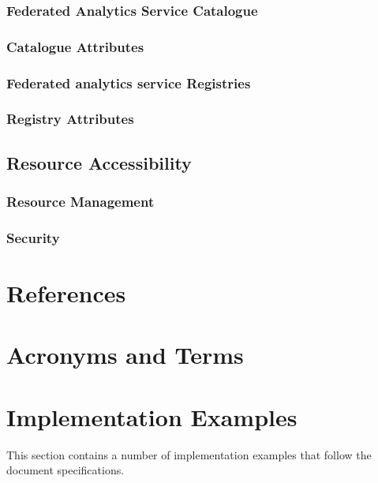 \documentclass[12pt]{article}
\begin{document}
\subsubsection{Federated Analytics Service Catalogue}
\subsubsection{Catalogue Attributes}
\subsubsection{Federated analytics service Registries}
\subsubsection{Registry Attributes}

\subsection{Resource Accessibility}
\subsubsection{Resource Management}
\subsubsection{Security}





\section*{References}



\appendix

\section{Acronyms and Terms}


\begin{quote}
    
\end{quote}



\section{Implementation Examples}

This section contains a number of implementation examples that follow the document specifications.
\end{document}
